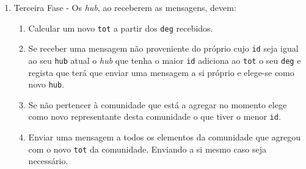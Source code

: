 \documentclass[a4paper,10pt]{report}
\begin{document}
\begin{algorithm}[H]
\begin{minipage}{\textwidth}
\begin{enumerate}
		\begin{enumerate}
				\item Se não for a primeira vez que está na segunda fase o vértice deve verificar se não existiram mudanças de comunidade na segunda fase anterior e
						\subitem Se não for a primeira vez que está no primeiro passo e nunca ocorreram mudanças em nenhumas das segundas fases deste passo deve parar o algoritmo
						\subitem Caso contrário, deve começar o segundo passo descrito no algoritmo~\ref{alg:lmdPasso2}
				\item Calcular a melhor comunidade utilizando a equação ((Ref para eq))\footnote{Quando se calcula se a comunidade atual é a melhor comunidade é necessário remover o \textit{deg} atual do \textit{tot} da comunidade e, se o \textit{tot} passar a ser 0 então o ganho de modularidade será 0 de modo a impedir que os vértices nunca mudem de comunidade}. 
				Em caso de empate	escolher a comunidade em que \verb|hub| seja o menor.
				\item Em iteração pares o vértice não move para comunidades cujo \verb|hub| seja menor que o seu \verb|hub| atual.
				\item Registar globalmente se mudou de comunidade
				\item Atualizar \verb|hub| com o \verb|hub| da melhor comunidade e enviar para o \verb|hub| uma mensagem contendo \verb|id| e \verb|deg|.
		\end{enumerate}
		
  \item Terceira Fase - Os \textit{hub}, ao receberem as mensagens, devem:
\begin{enumerate}
		\item Calcular um novo \verb|tot| a partir dos \verb|deg| recebidos.
		\item Se receber uma mensagem não proveniente do próprio cujo \verb|id| seja igual ao seu \verb|hub| atual o \textit{hub} que tenha o maior \verb|id| adiciona ao \verb|tot| o seu \verb|deg| e regista que terá que enviar uma mensagem a si próprio e elege-se como novo \verb|hub|.
		\label{prt:cycle}
		\item Se não pertencer à comunidade que está a agregar no momento elege como novo representante desta comunidade o que tiver o menor \verb|id|.
		\label{prt:same}
		\item Enviar uma mensagem a todos os elementos da comunidade que agregou com o novo \verb|tot| da comunidade. Enviando a si mesmo caso seja necessário.
\end{enumerate}
\end{enumerate}

	\end{minipage}
\end{algorithm}
\end{document}
